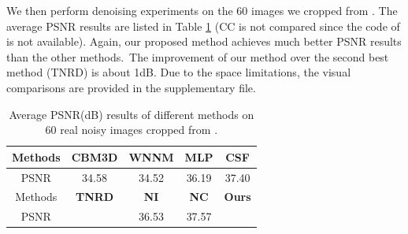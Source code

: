 \documentclass[10pt,twocolumn,letterpaper]{article}
\begin{document}
We then perform denoising experiments on the 60 images we cropped from \cite{crosschannel2016}. The average PSNR results are listed in Table \ref{tab3} (CC is not compared since the code of \cite{crosschannel2016} is not available). Again, our proposed method achieves much better PSNR results than the other methods.\ The improvement of our method over the second best method (TNRD) is about 1dB. Due to the space limitations, the visual comparisons are provided in the supplementary file.

\begin{table}
\caption{Average PSNR(dB) results of different methods on 60 real noisy images cropped from \cite{crosschannel2016}.}
\vspace{-3mm}
\label{tab3}
\begin{center}
\renewcommand\arraystretch{1}
\begin{tabular}{|c||c|c|c|c|}
\hline
 Methods& \textbf{CBM3D}&\textbf{WNNM}&\textbf{MLP}&\textbf{CSF}
\\
\hline
PSNR &   34.58 & 34.52 & 36.19 & 37.40
\\
\hline
Methods& \textbf{TNRD}& \textbf{NI}& \textbf{NC} &\textbf{Ours} 
\\
\hline
PSNR &  {\color{blue}{37.75}} & 36.53 & 37.57  & {\color{red}{ 38.75}}
\\
\hline
\end{tabular}
\end{center}\vspace{-6mm}
\end{table}
\end{document}
